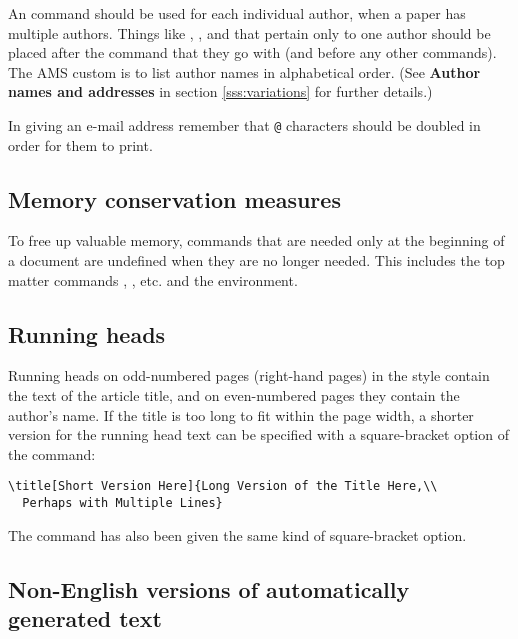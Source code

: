 An  command should be used for each individual author,
when a paper has multiple authors.
Things like , , and
 that pertain only to one author  should be placed after
the  command that they go with (and before any other
 commands).  The AMS custom is to list author names in
alphabetical order. (See {\bf Author names and addresses} in section
\ref{sss:variations} for further details.)

In giving an e-mail address remember that \verb=@= characters
should be doubled in order for them to print.

\subsection{Memory conservation measures}
To free up valuable memory, commands that are needed only at the
beginning of a document are undefined when they are no longer needed.
This includes the top matter commands , , etc. and the
 environment.

\subsection{Running heads}

Running heads on odd-numbered pages (right-hand pages) in the
 style contain the text of the article title, and on
even-numbered pages they contain the author's name.  If the title is
too long to fit within the page width, a shorter version
for the running head text can be
specified with a square-bracket option of the 
command:
\begin{verbatim}
\title[Short Version Here]{Long Version of the Title Here,\\
  Perhaps with Multiple Lines}
\end{verbatim}
The  command has also been given the same
kind of square-bracket option.

\subsection{Non-English versions of automatically generated text}

